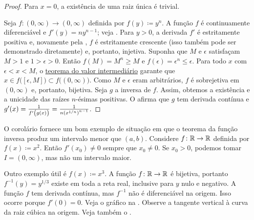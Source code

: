 \begin{proof}
Para $x=0$, a existência de uma raiz única é trivial.

Seja $f \colon (0,\infty) \to (0,\infty)$ definida por $f(y) \coloneqq y^n$. A função $f$ é continuamente diferenciável e $f'(y)=ny^{n-1}$; veja . Para $y>0$, a derivada $f'$ é estritamente positiva e, novamente pela , $f$ é estritamente crescente (isso também pode ser demonstrado diretamente) e, portanto, injetiva.
Suponha que $M$ e $\epsilon$ satisfaçam $M>1$ e $1>\epsilon>0$. Então $f(M)=M^n \geq M$ e $f(\epsilon)=\epsilon^n \leq \epsilon$. Para todo $x$ com $\epsilon<x<M$, o \hyperref[IVT:thm]{teorema do valor intermediário} garante que $x \in f\bigl( [\epsilon,M] \bigr) \subset f\bigl( (0,\infty) \bigr)$.
Como $M$ e $\epsilon$ eram arbitrários, $f$ é sobrejetiva em $(0,\infty)$ e, portanto, bijetiva. Seja $g$ a inversa de $f$. Assim, obtemos a existência e a unicidade das raízes $n$-ésimas positivas. O  afirma que $g$ tem derivada contínua e $g'(x) = \frac{1}{f'\left(\vphantom{1^1_1}g(x)\right)} = \frac{1}{n {(x^{1/n})}^{n-1}}$.
\end{proof}

\begin{example}
O corolário fornece um bom exemplo de situação em que o teorema da função inversa produz um intervalo menor que $(a,b)$. Considere $f \colon {\mathbb{R}} \to {\mathbb{R}}$ definida por $f(x) \coloneqq x^2$. Então $f'(x_0) \neq 0$ sempre que $x_0 \neq 0$. Se $x_0>0$, podemos tomar $I=(0,\infty)$, mas não um intervalo maior.
\end{example}

\begin{example}
Outro exemplo útil é $f(x) \coloneqq x^3$. A função $f \colon {\mathbb{R}} \to {\mathbb{R}}$ é bijetiva, portanto $f^{-1}(y)=y^{1/3}$ existe em toda a reta real, inclusive para $y$ nulo e negativo. A função $f$ tem derivada contínua, mas $f^{-1}$ não é diferenciável na origem. Isso ocorre porque $f'(0)=0$. Veja o gráfico na . Observe a tangente vertical à curva da raiz cúbica na origem. Veja também o .
\begin{myfigureht}
\caption{Gráficos de $x^3$ e $x^{1/3}$.\label{cubecuberootfig}}
\end{myfigureht}
\end{example}


